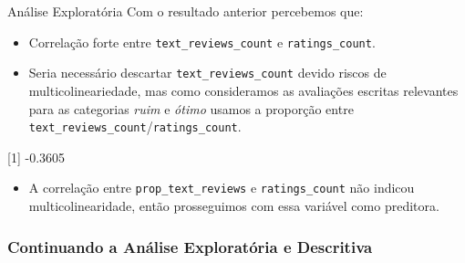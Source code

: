 \documentclass[
  9 pt,
  ignorenonframetext,
]{beamer}
\newenvironment{Shaded}{\begin{snugshade}}{\end{snugshade}}
\newcommand{\AttributeTok}[1]{\textcolor[rgb]{0.77,0.63,0.00}{#1}}
\newcommand{\FunctionTok}[1]{\textcolor[rgb]{0.00,0.00,0.00}{#1}}
\newcommand{\NormalTok}[1]{#1}
\newcommand{\OtherTok}[1]{\textcolor[rgb]{0.56,0.35,0.01}{#1}}
\newcommand{\SpecialCharTok}[1]{\textcolor[rgb]{0.00,0.00,0.00}{#1}}
\newcommand{\StringTok}[1]{\textcolor[rgb]{0.31,0.60,0.02}{#1}}
\providecommand{\tightlist}{%
  \setlength{\itemsep}{0pt}\setlength{\parskip}{0pt}}
\begin{document}
\begin{frame}[fragile]{Análise Exploratória}
Com o resultado anterior percebemos que:

\begin{itemize}
\tightlist
\item
  Correlação forte entre \texttt{text\_reviews\_count} e
  \texttt{ratings\_count}.
\item
  Seria necessário descartar \texttt{text\_reviews\_count} devido riscos
  de multicolineariedade, mas como consideramos as avaliações escritas
  relevantes para as categorias \emph{ruim} e \emph{ótimo} usamos a
  proporção entre \texttt{text\_reviews\_count}/\texttt{ratings\_count}.
\end{itemize}

\begin{Shaded}
\end{Shaded}

{[}1{]} -0.3605

\begin{itemize}
\tightlist
\item
  A correlação entre \texttt{prop\_text\_reviews} e
  \texttt{ratings\_count} não indicou multicolinearidade, então
  prosseguimos com essa variável como preditora.
\end{itemize}
\end{frame}

\hypertarget{continuando-a-anuxe1lise-exploratuxf3ria-e-descritiva}{%
\subsubsection{Continuando a Análise Exploratória e
Descritiva}\label{continuando-a-anuxe1lise-exploratuxf3ria-e-descritiva}}
\end{document}
